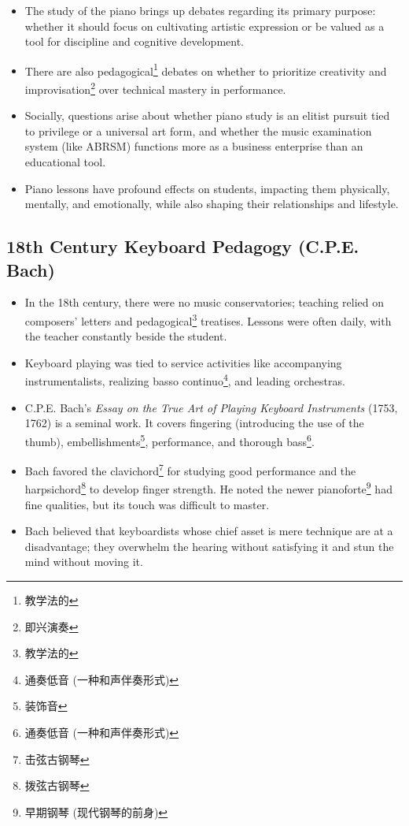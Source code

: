 \documentclass[math,code]{amznotes}
\theoremstyle{remark}
\begin{document}
\begin{itemize}
    \item The study of the piano brings up debates regarding its primary purpose: whether it should focus on cultivating artistic expression or be valued as a tool for discipline and cognitive development.
    \item There are also pedagogical\footnote{教学法的} debates on whether to prioritize creativity and improvisation\footnote{即兴演奏} over technical mastery in performance.
    \item Socially, questions arise about whether piano study is an elitist pursuit tied to privilege or a universal art form, and whether the music examination system (like ABRSM) functions more as a business enterprise than an educational tool.
    \item Piano lessons have profound effects on students, impacting them physically, mentally, and emotionally, while also shaping their relationships and lifestyle.
\end{itemize}

\subsection{18th Century Keyboard Pedagogy (C.P.E. Bach)}

\begin{itemize}
    \item In the 18th century, there were no music conservatories; teaching relied on composers' letters and pedagogical\footnote{教学法的} treatises. Lessons were often daily, with the teacher constantly beside the student.
    \item Keyboard playing was tied to service activities like accompanying instrumentalists, realizing basso continuo\footnote{通奏低音 (一种和声伴奏形式)}, and leading orchestras.
    \item C.P.E. Bach's \textit{Essay on the True Art of Playing Keyboard Instruments} (1753, 1762) is a seminal work. It covers fingering (introducing the use of the thumb), embellishments\footnote{装饰音}, performance, and thorough bass\footnote{通奏低音 (一种和声伴奏形式)}.
    \item Bach favored the clavichord\footnote{击弦古钢琴} for studying good performance and the harpsichord\footnote{拨弦古钢琴} to develop finger strength. He noted the newer pianoforte\footnote{早期钢琴 (现代钢琴的前身)} had fine qualities, but its touch was difficult to master.
    \item Bach believed that keyboardists whose chief asset is mere technique are at a disadvantage; they overwhelm the hearing without satisfying it and stun the mind without moving it.
\end{itemize}
\end{document}
